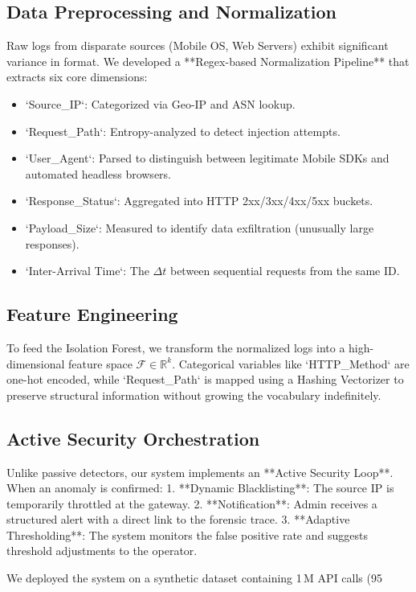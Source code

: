 \documentclass[preprint,12pt,a4paper]{elsarticle}
\begin{document}
\subsection{Data Preprocessing and Normalization}
Raw logs from disparate sources (Mobile OS, Web Servers) exhibit significant variance in format. We developed a **Regex-based Normalization Pipeline** that extracts six core dimensions:
\begin{itemize}
    \item `Source_IP`: Categorized via Geo-IP and ASN lookup.
    \item `Request_Path`: Entropy-analyzed to detect injection attempts.
    \item `User_Agent`: Parsed to distinguish between legitimate Mobile SDKs and automated headless browsers.
    \item `Response_Status`: Aggregated into HTTP 2xx/3xx/4xx/5xx buckets.
    \item `Payload_Size`: Measured to identify data exfiltration (unusually large responses).
    \item `Inter-Arrival Time`: The $\Delta t$ between sequential requests from the same ID.
\end{itemize}

\subsection{Feature Engineering}
To feed the Isolation Forest, we transform the normalized logs into a high-dimensional feature space $\mathcal{F} \in \mathbb{R}^k$. Categorical variables like `HTTP_Method` are one-hot encoded, while `Request_Path` is mapped using a Hashing Vectorizer to preserve structural information without growing the vocabulary indefinitely.

\subsection{Active Security Orchestration}
Unlike passive detectors, our system implements an **Active Security Loop**. When an anomaly is confirmed:
1. **Dynamic Blacklisting**: The source IP is temporarily throttled at the gateway.
2. **Notification**: Admin receives a structured alert with a direct link to the forensic trace.
3. **Adaptive Thresholding**: The system monitors the false positive rate and suggests threshold adjustments to the operator.

We deployed the system on a synthetic dataset containing 1 M API calls (95 %
\end{document}
